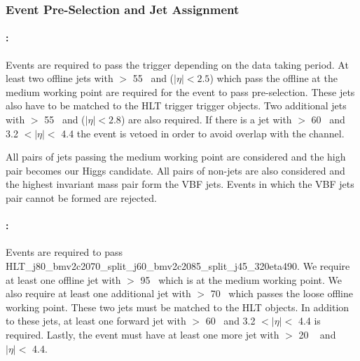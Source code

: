 \subsubsection{Event Pre-Selection and Jet Assignment}
\label{sec:vbf-presel}

\paragraph{\fourcentral:} Events are required to pass the \fourcentral trigger depending on the data taking period. At least two offline jets with \pT $>$ 55 \GeV~and ($|\eta| < 2.5$) which pass the offline \btagging at the medium working point are required for the event to pass pre-selection.  These jets also have to be matched to the HLT trigger \btagged trigger objects. Two additional jets with \pT $>$ 55 \GeV~and  ($|\eta| < 2.8$) are also required. If there is a jet with \pT $>$ 60 \GeV~and 3.2 $< |\eta| <$ 4.4 the event is vetoed in order to avoid overlap with the \twocentral channel.

All pairs of \btagged jets passing the medium working point are considered and the high \pT  pair becomes our Higgs candidate.  All pairs of non-\btagged jets are also considered and the highest invariant mass pair form the VBF jets. Events in which the VBF jets pair cannot be formed are rejected.


\paragraph{\twocentral:} Events are required to pass HLT\_j80\_bmv2c2070\_split\_j60\_bmv2c2085\_split\_j45\_320eta490.   We require at least one offline jet with \pT $>$ 95 \GeV~which is \btagged at the medium working point.  We also require at least one additional jet with \pT $>$ 70 \GeV~which passes the loose offline \btagging working point.  These two jets must be matched to the HLT \btagged objects.  In addition to these jets, at least one forward jet with \pT $>$ 60 \GeV~and 3.2 $< |\eta| <$ 4.4 is required.  Lastly, the event must have at least one more jet with \pT $>$ 20 \GeV~ and $|\eta| <$ 4.4.  

